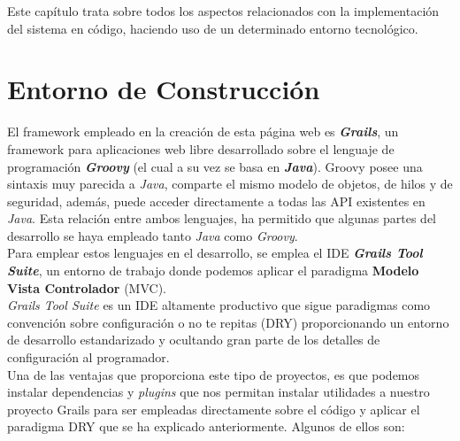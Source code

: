 

Este capítulo trata sobre todos los aspectos relacionados con la implementación del sistema en código, haciendo uso de un determinado entorno tecnológico.

\section{Entorno de Construcción}

El framework empleado en la creación de esta página web es \textit{\textbf{Grails}}, un framework para aplicaciones web libre desarrollado sobre el lenguaje de programación \textit{\textbf{Groovy}} (el cual a su vez se basa en \textit{\textbf{Java}}). Groovy posee una sintaxis muy parecida a \textit{Java}, comparte el mismo modelo de objetos, de hilos y de seguridad, además, puede acceder directamente a todas las API existentes en \textit{Java}. Esta relación entre ambos lenguajes, ha permitido que algunas partes del desarrollo se haya empleado tanto \textit{Java} como \textit{Groovy}.\\

Para emplear estos lenguajes en el desarrollo, se emplea el IDE \textit{\textbf{Grails Tool Suite}}, un entorno de trabajo donde podemos aplicar el paradigma \textbf{Modelo Vista Controlador} (MVC).\\

\textit{Grails Tool Suite} es un IDE altamente productivo que sigue paradigmas como convención sobre configuración o no te repitas (DRY) proporcionando un entorno de desarrollo estandarizado y ocultando gran parte de los detalles de configuración al programador.\\

Una de las ventajas que proporciona este tipo de proyectos, es que podemos instalar dependencias y \textit{plugins} que nos permitan instalar utilidades a nuestro proyecto Grails para ser empleadas directamente sobre el código y aplicar el paradigma DRY que se ha explicado anteriormente. Algunos de ellos son:

